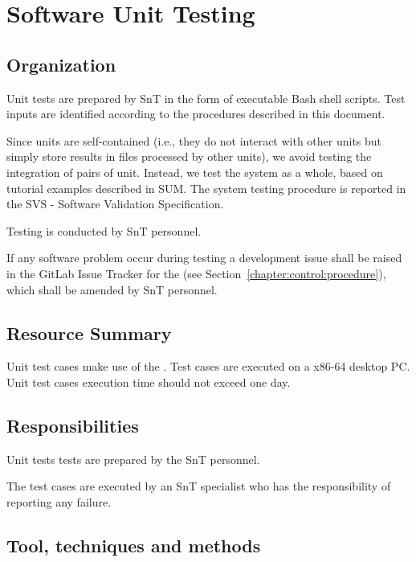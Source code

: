 
\chapter{Software Unit Testing}

\section{Organization}
\label{sec:SUTSIT:org}

Unit tests are prepared by SnT in the form of executable Bash shell scripts. Test inputs are identified according to the procedures described in this document.

Since units are self-contained (i.e., they do not interact with other units but simply store results in files processed by other units), we avoid testing the integration of pairs of unit. Instead, we test the system as a whole, based on tutorial examples described in SUM. The system testing procedure is reported in the SVS - Software Validation Specification.

Testing is conducted by SnT personnel.

If any software problem occur during testing a development issue shall be raised in the GitLab Issue Tracker for the \FAQAS (see Section~\ref{chapter:control:procedure}), which shall be amended by SnT personnel.



\section{Resource Summary}

Unit test cases make use of the \FAQAS. Test cases are executed on a x86-64 desktop PC. Unit test cases execution time should not exceed one day.

\section{Responsibilities}

Unit tests tests are prepared by the SnT personnel.

The test cases are executed by an SnT specialist who has the responsibility of reporting any failure.

\section{Tool, techniques and methods}


